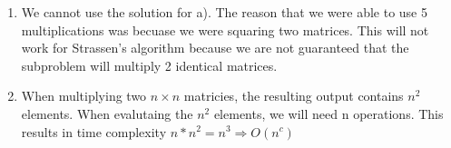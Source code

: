 \documentclass[11pt]{article}
\begin{document}
\begin{enumerate}
\begin{enumerate}
\item We cannot use the solution for a). The reason that we were able to use 5 multiplications was becuase we were squaring two matrices. This will not work for Strassen's algorithm because we are not guaranteed that the subproblem will multiply 2 identical matrices.

\item When multiplying two $n \times n$ matricies, the resulting output contains $n^2$ elements. When evalutaing the $n^2$ elements, we will need n operations. This results in time complexity $n*n^2 = n^3 \Rightarrow O(n^c)$

\end{enumerate}

\end{enumerate}
\end{document}
